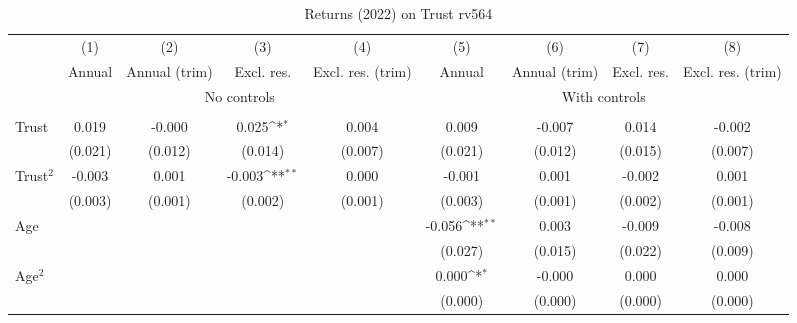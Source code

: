 \begin{table}[htbp]\centering
\def\sym#1{\ifmmode^{#1}\else\(^{#1}\)\fi}
\caption{Returns (2022) on Trust rv564}
\begin{tabular}{l*{8}{c}}
\toprule
          &\multicolumn{1}{c}{(1)}&\multicolumn{1}{c}{(2)}&\multicolumn{1}{c}{(3)}&\multicolumn{1}{c}{(4)}&\multicolumn{1}{c}{(5)}&\multicolumn{1}{c}{(6)}&\multicolumn{1}{c}{(7)}&\multicolumn{1}{c}{(8)}\\
          &\multicolumn{1}{c}{Annual}&\multicolumn{1}{c}{Annual (trim)}&\multicolumn{1}{c}{Excl. res.}&\multicolumn{1}{c}{Excl. res. (trim)}&\multicolumn{1}{c}{Annual}&\multicolumn{1}{c}{Annual (trim)}&\multicolumn{1}{c}{Excl. res.}&\multicolumn{1}{c}{Excl. res. (trim)}\\
& \multicolumn{4}{c}{No controls} & \multicolumn{4}{c}{With controls} \\\\ \cmidrule(lr){2-5}\cmidrule(lr){6-9}
Trust     &    0.019         &   -0.000         &    0.025\sym{*}  &    0.004         &    0.009         &   -0.007         &    0.014         &   -0.002         \\
          &  (0.021)         &  (0.012)         &  (0.014)         &  (0.007)         &  (0.021)         &  (0.012)         &  (0.015)         &  (0.007)         \\
Trust$^{2}$&   -0.003         &    0.001         &   -0.003\sym{**} &    0.000         &   -0.001         &    0.001         &   -0.002         &    0.001         \\
          &  (0.003)         &  (0.001)         &  (0.002)         &  (0.001)         &  (0.003)         &  (0.001)         &  (0.002)         &  (0.001)         \\
Age       &                  &                  &                  &                  &   -0.056\sym{**} &    0.003         &   -0.009         &   -0.008         \\
          &                  &                  &                  &                  &  (0.027)         &  (0.015)         &  (0.022)         &  (0.009)         \\
Age$^{2}$ &                  &                  &                  &                  &    0.000\sym{*}  &   -0.000         &    0.000         &    0.000         \\
          &                  &                  &                  &                  &  (0.000)         &  (0.000)         &  (0.000)         &  (0.000)         \\

\end{tabular}
\end{table}
